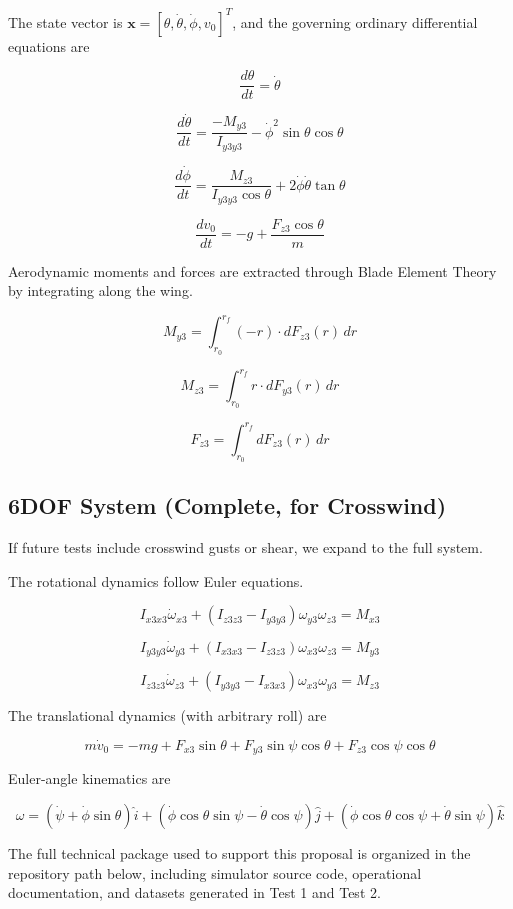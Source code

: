 \documentclass[12pt,a4paper]{article}
\begin{document}
The state vector is $\mathbf{x} = [\theta, \dot{\theta}, \dot{\phi}, v_0]^T$, and the governing ordinary differential equations are

\[
\frac{d\theta}{dt} = \dot{\theta}
\]

\[
\frac{d\dot{\theta}}{dt} = \frac{-M_{y3}}{I_{y3y3}} - \dot{\phi}^2 \sin\theta \cos\theta
\]

\[
\frac{d\dot{\phi}}{dt} = \frac{M_{z3}}{I_{y3y3} \cos\theta} + 2\dot{\phi}\dot{\theta} \tan\theta
\]

\[
\frac{dv_0}{dt} = -g + \frac{F_{z3}\cos\theta}{m}
\]

Aerodynamic moments and forces are extracted through Blade Element Theory by integrating along the wing.

\[
M_{y3} = \int_{r_0}^{r_f} (-r)\cdot dF_{z3}(r) \, dr
\]

\[
M_{z3} = \int_{r_0}^{r_f} r\cdot dF_{y3}(r) \, dr
\]

\[
F_{z3} = \int_{r_0}^{r_f} dF_{z3}(r) \, dr
\]

\subsection{6DOF System (Complete, for Crosswind)}

If future tests include crosswind gusts or shear, we expand to the full system.

The rotational dynamics follow Euler equations.

\[
I_{x3x3} \dot{\omega}_{x3} + (I_{z3z3} - I_{y3y3})\omega_{y3}\omega_{z3} = M_{x3}
\]

\[
I_{y3y3} \dot{\omega}_{y3} + (I_{x3x3} - I_{z3z3})\omega_{x3}\omega_{z3} = M_{y3}
\]

\[
I_{z3z3} \dot{\omega}_{z3} + (I_{y3y3} - I_{x3x3})\omega_{x3}\omega_{y3} = M_{z3}
\]

The translational dynamics (with arbitrary roll) are

\[
m \dot{v}_0 = -mg + F_{x3} \sin\theta + F_{y3} \sin\psi \cos\theta + F_{z3} \cos\psi \cos\theta
\]

Euler-angle kinematics are

\[
\omega = (\dot{\psi} + \dot{\phi}\sin\theta)\hat{i} + (\dot{\phi}\cos\theta\sin\psi - \dot{\theta}\cos\psi)\hat{j} + (\dot{\phi}\cos\theta\cos\psi + \dot{\theta}\sin\psi)\hat{k}
\]

\vspace{0.5em}

The full technical package used to support this proposal is organized in the repository path below, including simulator source code, operational documentation, and datasets generated in Test 1 and Test 2.
\end{document}
